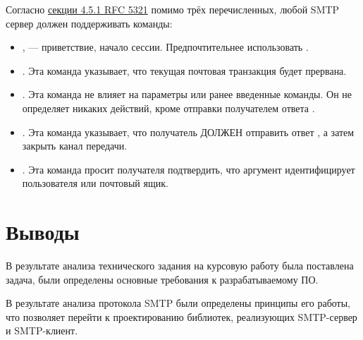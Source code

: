 Согласно \href{https://tools.ietf.org/html/rfc5321#section-4.5.1}{секции 4.5.1 RFC 5321} помимо трёх перечисленных, любой SMTP сервер должен поддерживать команды:
\begin{itemize}
	\item {},  — приветствие, начало сессии.
	Предпочтительнее использовать .
	\item {}.
	Эта команда указывает, что текущая почтовая транзакция будет прервана.
	\item {}.
	Эта команда не влияет на параметры или ранее введенные команды. Он не определяет никаких действий, кроме отправки получателем ответа .
	\item {}.
	Эта команда указывает, что получатель ДОЛЖЕН отправить ответ , а затем закрыть канал передачи.
	\item {}.
	Эта команда просит получателя подтвердить, что аргумент идентифицирует пользователя или почтовый ящик.
\end{itemize}

\section{Выводы}

В результате анализа технического задания на курсовую работу была поставлена задача, были определены основные требования к разрабатываемому ПО.

В результате анализа протокола SMTP были определены принципы его работы, что позволяет перейти к проектированию библиотек, реализующих SMTP-сервер и SMTP-клиент.